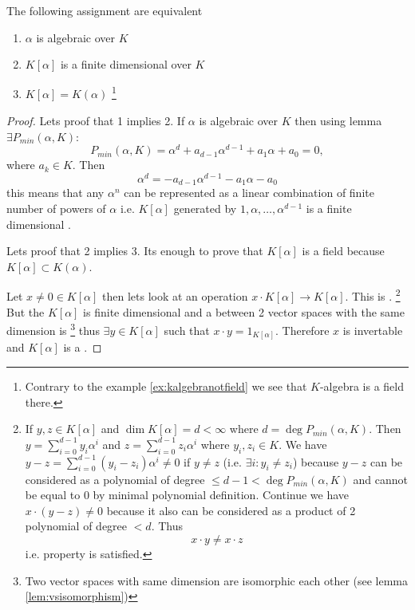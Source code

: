 \begin{proposition}
  The following assignment are equivalent
  \begin{enumerate}
  \item $\alpha$ is algebraic over $K$
  \item $K\left[\alpha\right]$ is a finite dimensional
     over $K$
  \item $K\left[\alpha\right] = K\left(\alpha\right)$
    \footnote{
      Contrary to the example \ref{ex:kalgebranotfield} we see
      that $K$-algebra is a field there.
    }
  \end{enumerate}
  \begin{proof}
    Lets proof that 1 implies 2. If $\alpha$ is algebraic over $K$
    then using lemma  $\exists
    P_{min}\left(\alpha, K\right)$:
    \[
    P_{min}\left(\alpha, K\right) = \alpha^d + a_{d-1}\alpha^{d-1} +
    a_1 \alpha + a_0 = 0,
    \]
    where $a_k \in K$. Then
    \[
    \alpha^d  = - a_{d-1}\alpha^{d-1} -
    a_1 \alpha - a_0
    \]
    this means that any $\alpha^n$ can be represented as a linear
    combination of finite number of powers of $\alpha$ i.e.
    $K\left[\alpha\right]$ generated by $1, \alpha, \dots,
    \alpha^{d-1}$ is a finite dimensional .

    Lets proof that 2 implies 3. Its enough to prove that
    $K\left[\alpha\right]$ is a field because
    $K\left[\alpha\right] \subset K\left(\alpha\right)$.
    
    Let $x \ne 0 \in
    K\left[\alpha\right]$ then lets look at an operation
    $x \cdot K\left[\alpha\right] \rightarrow
    K\left[\alpha\right]$. This is .
    \footnote{
      If $y, z \in K\left[\alpha\right]$ and
      $\dim K\left[\alpha\right] = d < \infty$ where
      $d = \deg P_{min}\left(\alpha, K\right)$. Then
      $y = \sum_{i=0}^{d-1} y_i \alpha^i$ and
      $z = \sum_{i=0}^{d-1} z_i \alpha^i$ where $y_i, z_i \in K$.
      We have $y - z = \sum_{i=0}^{d-1} \left(y_i - z_i\right)
      \alpha^i \ne 0$ if $y \ne z$ (i.e.
      $\exists i: y_i \ne z_i$)
      because $y -z$ can be considered as a polynomial of degree
      $ \le d - 1 < \deg P_{min}\left(\alpha, K\right)$ and cannot be equal
      to 0 by minimal polynomial definition.
      Continue we have $x \cdot \left(y - z\right) \ne 0$ because it
      also can be considered as a product of 2 polynomial of degree
      $< d$. 
      Thus
      \[
      x \cdot y  \ne x \cdot z
      \]
      i.e.  property is satisfied.
    }
    But the $K\left[\alpha\right]$ is finite dimensional
     and a  between
    2 vector spaces with the same dimension is
    \footnote{
      Two vector spaces with same dimension are isomorphic each other
      (see lemma \ref{lem:vsisomorphism})
    }
    thus $\exists y \in K\left[\alpha\right]$
    such that $x \cdot y = 1_{K\left[\alpha\right]}$. Therefore $x$ is
    invertable and $K\left[\alpha\right]$ is a
    .


\end{proof}
\end{proposition}
